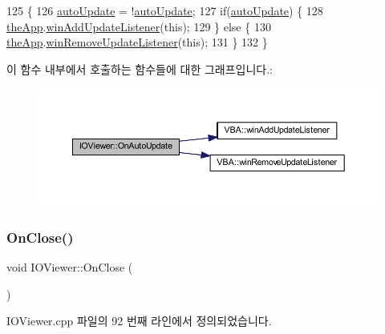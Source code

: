 \begin{DoxyCode}
125 \{
126   \mbox{\hyperlink{class_i_o_viewer_a6f3bc2241e369ffba682365f58412dc7}{autoUpdate}} = !\mbox{\hyperlink{class_i_o_viewer_a6f3bc2241e369ffba682365f58412dc7}{autoUpdate}};
127   \textcolor{keywordflow}{if}(\mbox{\hyperlink{class_i_o_viewer_a6f3bc2241e369ffba682365f58412dc7}{autoUpdate}}) \{
128     \mbox{\hyperlink{_v_b_a_8cpp_a8095a9d06b37a7efe3723f3218ad8fb3}{theApp}}.\mbox{\hyperlink{class_v_b_a_af0712f70a90d023ab8327a366be08174}{winAddUpdateListener}}(\textcolor{keyword}{this});
129   \} \textcolor{keywordflow}{else} \{
130     \mbox{\hyperlink{_v_b_a_8cpp_a8095a9d06b37a7efe3723f3218ad8fb3}{theApp}}.\mbox{\hyperlink{class_v_b_a_a2d31a0656df2230310aa8dc9e3a735d3}{winRemoveUpdateListener}}(\textcolor{keyword}{this});    
131   \}  
132 \}
\end{DoxyCode}
이 함수 내부에서 호출하는 함수들에 대한 그래프입니다.\+:
\nopagebreak
\begin{figure}[H]
\begin{center}
\leavevmode
\includegraphics[width=350pt]{class_i_o_viewer_a8e9ae4ebf837dff76500534337c0d609_cgraph}
\end{center}
\end{figure}
\mbox{\label{class_i_o_viewer_a99c1044f4eed5c69ca652edfc032289d}} 
\subsubsection{\texorpdfstring{On\+Close()}{OnClose()}}
{\footnotesize\ttfamily void I\+O\+Viewer\+::\+On\+Close (\begin{DoxyParamCaption}{ }\end{DoxyParamCaption})\hspace{0.3cm}{\ttfamily [protected]}}



I\+O\+Viewer.\+cpp 파일의 92 번째 라인에서 정의되었습니다.


